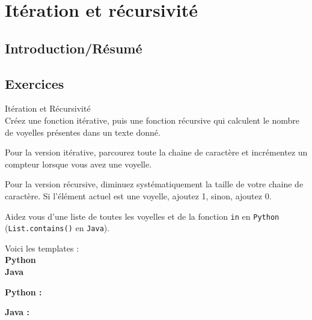 \section{Itération et récursivité}

\subsection{Introduction/Résumé}

\subsection{Exercices}

\begin{Exercice}[15 min] Itération et Récursivité\\

Créez une fonction itérative, puis une fonction récursive qui calculent le nombre de voyelles présentes dans un texte donné. \\

\begin{conseil}
   Pour la version itérative, parcourez toute la chaine de caractère et incrémentez un compteur lorsque vous avez une voyelle.
   
   Pour la version récursive, diminuez systématiquement la taille de votre chaine de caractère. Si l'élément actuel est une voyelle, ajoutez 1, sinon, ajoutez 0.
   
   Aidez vous d'une liste de toutes les voyelles et de la fonction \lstinline{in} en \lstinline{Python} (\lstinline{List.contains()} en \lstinline{Java}).
\end{conseil}

Voici les templates : \\

\textbf{Python} \\

     

\textbf{Java} \\

    

    
\begin{solution}
\textbf{Python :} \\

    
    
\end{solution}


\begin{solution}   
\textbf{Java :} \\

    
    
    
    
\end{solution}

\end{Exercice}

